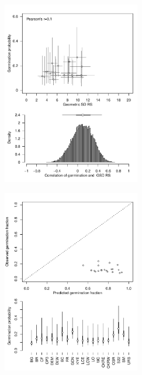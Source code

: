 \documentclass[varwidth=\maxdimen,border=0pt]{standalone}
\begin{document}
    

\begin{figure}

    \begin{subfigure}{6cm}
        \centering
        \includegraphics[width=6cm]{../../figures/analysis/correlation-germ-rs-lowfitness.pdf} 
    \end{subfigure}%
    \begin{subfigure}{6cm}
        \centering
        \includegraphics[width=6cm]{../../figures/analysis/obs-pred-germ-lowFitness.pdf} 
    \end{subfigure}
   \end{figure}
  
  
\end{document}
